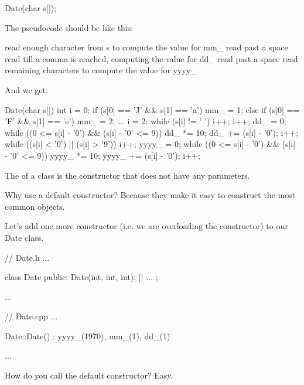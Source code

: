 \begin{consolethree}[escapeinside=||]
Date(char s[]);
\end{consolethree}

The pseudocode should be like this:

\begin{consolethree}[escapeinside=||]
read enough character from s to compute the value for mm_
read past a space
read till a comma is reached, computing the value for dd_
read past a space
read remaining characters to compute the value for yyyy_
\end{consolethree}

And we get:

\begin{consolethree}[escapeinside=||]
Date(char s[])
{
    int i = 0;
    if (s[0] == 'J' && s[1] == 'a') mm_ = 1;
    else if (s[0] == 'F' && s[1] == 'e') mm_ = 2;
    ...
    i = 2;
    while (s[i] != ' ') i++;
    i++;
    dd_ = 0;
    while ((0 <= s[i] - '0') && (s[i] - '0' <= 9))
    {
        dd_ *= 10; dd_ += (s[i] - '0'); i++;
    }
    while ((s[i] < '0') || (s[i] > '9')) i++;
    yyyy_ = 0;
    while ((0 <= s[i] - '0') && (s[i] - '0' <= 9))
    {
        yyyy_ *= 10;
        yyyy_ += (s[i] - '0');
        i++;
    }
}
\end{consolethree}


\newpage{}

The  of a class is the constructor that does
not have any parameters.

Why use a default constructor? Because they make it easy to construct
the most common objects.

Let's add one more constructor (i.e. we are overloading the constructor)
to our Date class.

\begin{consolethree}[escapeinside=||]
// Date.h
...

class Date
{
public:
    Date(int, int, int);
    ||
    ...
};

...
\end{consolethree}

\begin{consolethree}[escapeinside=||]
// Date.cpp
...

Date::Date()
    : yyyy_(1970), mm_(1), dd_(1)
{}

...
\end{consolethree}

How do you call the default constructor? Easy.

